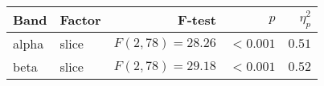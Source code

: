 \setlength{\tabcolsep}{0pt} %
\begin{tabular*}{\columnwidth}{@{\extracolsep{\fill}\quad}llrrr}
\textbf{Band} & \textbf{Factor} & \textbf{F-test} & \textbf{\(p\)} & \textbf{\( \eta^{2}_{p} \)} \\ \toprule
alpha   & slice & \( F(2, 78) = 28.26 \) & \( <0.001 \) & \( 0.51 \) \\ %
beta    & slice & \( F(2, 78) = 29.18 \) & \( <0.001 \) & \( 0.52 \) \\ \bottomrule
\end{tabular*}